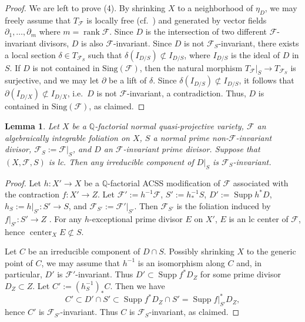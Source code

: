 \documentclass[11pt,reqno]{amsart}
\numberwithin{equation}{section}
\newcommand{\Center}{\operatorname{center}}
\newcommand{\rk}{\operatorname{rank}}
\newcommand{\Supp}{\operatorname{Supp}}
\newcommand{\Ff}{\mathcal{F}}
\newcommand{\Sing}{\mathrm{Sing}}
\newtheorem{lem}[thm]{Lemma}
\theoremstyle{definition}
\begin{document}
\begin{proof}
We are left to prove (4). By shrinking $X$ to a neighborhood of $\eta_D$, we may freely assume that $T_{\mathcal F}$ is locally free (cf.~\cite[Corollary~1.4]{Har80}) and generated by vector fields $\partial_1, \dots, \partial_m$ where $m = \rk \mathcal F$.
Since $D$ is the intersection of two different $\mathcal F$-invariant divisors, $D$ is also $\mathcal F$-invariant. Since $D$ is not $\mathcal F_S$-invariant, there exists a local section $\delta \in T_{\mathcal F_S}$ such that $\delta(I_{D/S}) \not\subset I_{D/S}$, where $I_{D/S}$ is the ideal of $D$ in $S$. If $D$ is not contained in $\Sing(\mathcal F)$, then the natural morphism $T_{\mathcal F}|_S \to T_{\mathcal F_S}$ is surjective, and we may let $\partial$ be a lift of $\delta$. Since $\delta(I_{D/S}) \not\subset I_{D/S}$,
it follows that $\partial(I_{D/X}) \not\subset I_{D/X}$, i.e.\ $D$ is not $\mathcal F$-invariant, a contradiction. Thus, $D$ is contained in $\Sing(\Ff)$, as claimed. 
\end{proof}


\begin{lem}\label{lem: invariant adjunction to non-invariant is invariant}
    Let $X$ be a $\mathbb Q$-factorial normal quasi-projective variety, $\Ff$ an algebraically integrable foliation on $X$, $S$ a normal prime non-$\Ff$-invariant divisor, $\Ff_S:=\Ff|_S$, and $D$ an $\Ff$-invariant prime divisor. Suppose that $(X,\mathcal F,S)$ is lc. Then any irreducible component of $D|_S$ is $\Ff_S$-invariant.
\end{lem}
\begin{proof}
Let $h\colon X'\rightarrow X$ be a $\mathbb Q$-factorial ACSS modification of $\Ff$ \cite[Theorem~2.5.1]{CHLX23} associated with the contraction $f: X'\rightarrow Z$. Let $\Ff':=h^{-1}\Ff$, $S':=h^{-1}_*S$, $D':=\Supp h^*D$, $h_S:=h|_{S'}: S'\rightarrow S$, and $\Ff_{S'}:=\Ff'|_{S'}$. Then $\Ff_{S'}$ is the foliation induced by $f|_{S'}: S'\rightarrow Z$ \cite[Proposition~3.2, Case II]{ACSS21}. For any $h$-exceptional prime divisor $E$ on $X'$, $E$ is an lc center of $\Ff$, hence $\Center_XE\not\subset S$.

Let $C$ be an irreducible component of $D\cap S$. Possibly shrinking $X$ to the generic point of $C$, we may assume that $h^{-1}$ is an isomorphism along $C$ and, in particular, $D'$ is $\Ff'$-invariant. Thus $D'\subset \Supp f^*D_Z$ for some prime divisor $D_Z\subset Z$. Let $C':=(h_S^{-1})_*C$. Then we have 
$$C'\subset D'\cap S'\subset \Supp f^*D_Z\cap S'=\Supp f|_{S'}^*D_Z,$$
hence $C'$ is $\Ff_{S'}$-invariant. Thus $C$ is $\Ff_S$-invariant, as claimed. 
\end{proof}
\end{document}
